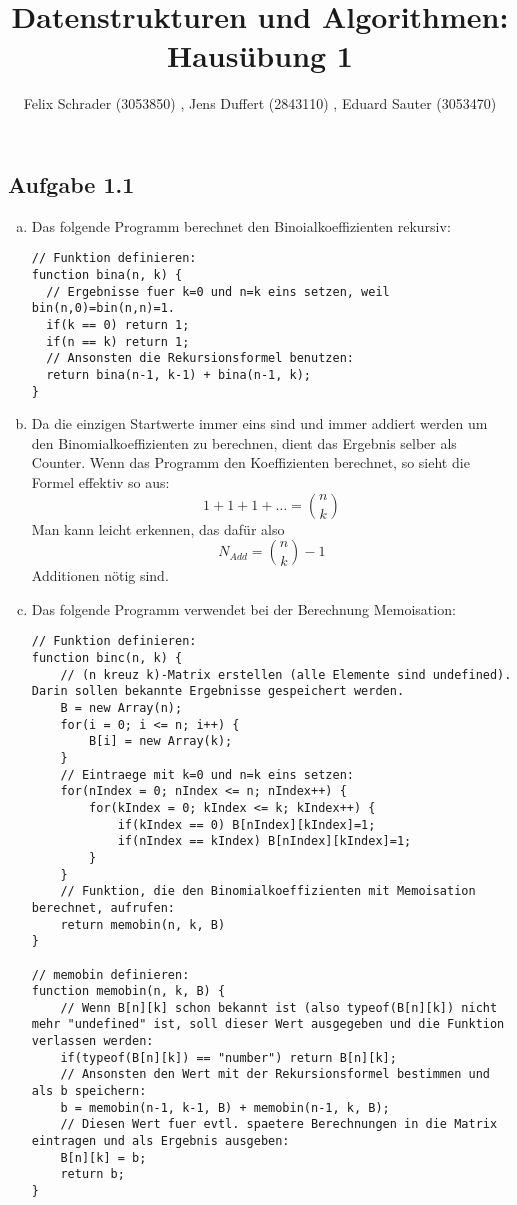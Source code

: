 \documentclass[11pt]{article}
\author{Felix Schrader (3053850) , Jens Duffert (2843110) , Eduard Sauter (3053470)}
\title{Datenstrukturen und Algorithmen: Haus\"ubung 1}
\begin{document}
\maketitle

\subsection*{Aufgabe 1.1}
\begin{enumerate}[a)]

\item Das folgende Programm berechnet den Binoialkoeffizienten rekursiv:

\begin{lstlisting}
// Funktion definieren:
function bina(n, k) {
  // Ergebnisse fuer k=0 und n=k eins setzen, weil bin(n,0)=bin(n,n)=1.
  if(k == 0) return 1;
  if(n == k) return 1;
  // Ansonsten die Rekursionsformel benutzen:
  return bina(n-1, k-1) + bina(n-1, k);
}
\end{lstlisting}

\item Da die einzigen Startwerte immer eins sind und immer addiert werden um den Binomialkoeffizienten zu berechnen, dient das Ergebnis selber als Counter. Wenn das Programm den Koeffizienten berechnet, so sieht die Formel effektiv so aus:\[ 1+1+1+\dots =\binom{n}{k} \]
Man kann leicht erkennen, das daf\"ur also
\begin{equation}
N_{Add}=\binom{n}{k}-1
\end{equation}
Additionen n\"otig sind.

\item Das folgende Programm verwendet bei der Berechnung Memoisation:

\begin{lstlisting}
// Funktion definieren:
function binc(n, k) {
    // (n kreuz k)-Matrix erstellen (alle Elemente sind undefined). Darin sollen bekannte Ergebnisse gespeichert werden.
    B = new Array(n);
    for(i = 0; i <= n; i++) {
        B[i] = new Array(k);
    }
    // Eintraege mit k=0 und n=k eins setzen:
    for(nIndex = 0; nIndex <= n; nIndex++) {
        for(kIndex = 0; kIndex <= k; kIndex++) {
            if(kIndex == 0) B[nIndex][kIndex]=1;
            if(nIndex == kIndex) B[nIndex][kIndex]=1;
        }
    }
    // Funktion, die den Binomialkoeffizienten mit Memoisation berechnet, aufrufen:
    return memobin(n, k, B)
}

// memobin definieren:
function memobin(n, k, B) {
    // Wenn B[n][k] schon bekannt ist (also typeof(B[n][k]) nicht mehr "undefined" ist, soll dieser Wert ausgegeben und die Funktion verlassen werden:
    if(typeof(B[n][k]) == "number") return B[n][k];
    // Ansonsten den Wert mit der Rekursionsformel bestimmen und als b speichern:
    b = memobin(n-1, k-1, B) + memobin(n-1, k, B);
    // Diesen Wert fuer evtl. spaetere Berechnungen in die Matrix eintragen und als Ergebnis ausgeben:
    B[n][k] = b;
    return b;
}
\end{lstlisting}

\end{enumerate}
\end{document}
